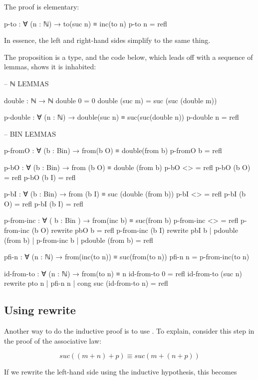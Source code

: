 The proof is elementary:

\begin{colored}[elm]
p-to : ∀ (n : ℕ) → to(suc n) ≡ inc(to n)
p-to n = refl
\end{colored}

In essence, the left and right-hand sides simplify to the same thing.

The proposition  is a type, and the code below, which leads off with a sequence of lemmas, shows it is inhabited:

\begin{colored}[elm]
-- ℕ LEMMAS

double : ℕ → ℕ
double 0 = 0
double (suc m) = suc (suc (double m))

p-double : ∀ (n : ℕ) → double(suc n) ≡ suc(suc(double n))
p-double n = refl
\end{colored}

\begin{colored}[elm]
-- BIN LEMMAS

p-fromO : ∀ (b : Bin) → from(b O) ≡ double(from b)
p-fromO b = refl

p-bO : ∀ (b : Bin) → from (b O) ≡ double (from b)
p-bO <> = refl
p-bO (b O) = refl
p-bO (b I) = refl

p-bI : ∀ (b : Bin) → from (b I) ≡ suc (double (from b))
p-bI <> = refl
p-bI (b O) = refl
p-bI (b I) = refl

p-from-inc : ∀ ( b : Bin ) → from(inc b) ≡ suc(from b)
p-from-inc <> = refl
p-from-inc (b O)  rewrite pbO b = refl
p-from-inc (b I) rewrite pbI b | pdouble (from b) | 
      p-from-inc b | pdouble (from b) = refl

pfi-n : ∀ (n : ℕ) → from(inc(to n)) ≡ suc(from(to n))
pfi-n n = p-from-inc(to n)

id-from-to : ∀ (n : ℕ) → from(to n) ≡ n
id-from-to 0 = refl
id-from-to (suc n) rewrite pto n | pfi-n n | 
    cong suc (id-from-to n) = refl
\end{colored}

\subsection{Using rewrite}


Another way to do the inductive proof is to use .  To explain, consider this step in the proof of the associative law:

$$
 suc ((m + n) + p) \equiv suc (m + (n + p))
$$

 If we rewrite the left-hand side using the inductive hypothesis, this becomes


